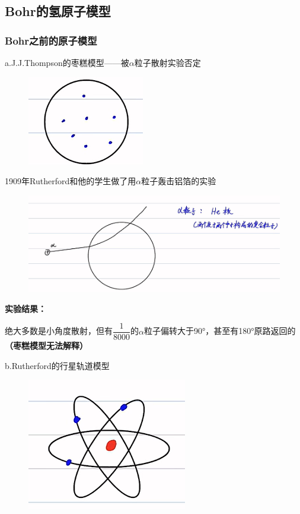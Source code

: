 \documentclass[lang=cn,10pt]{elegantbook}
\begin{document}
\subsection{Bohr的氢原子模型}
\subsubsection{Bohr之前的原子模型}
a.J.J.Thompson的枣糕模型——被$\alpha$粒子散射实验否定
\begin{figure}[H]
	\centering
	\includegraphics[width=0.7\linewidth]{figure/screenshot0010}
\end{figure}
1909年Rutherford和他的学生做了用$\alpha$粒子轰击铝箔的实验

\begin{figure}[H]
	\centering
	\includegraphics[width=0.7\linewidth]{figure/screenshot0011}
\end{figure}

\textbf{实验结果：}

绝大多数是小角度散射，但有$\dfrac{1}{8000}$的$\alpha$粒子偏转大于90°，甚至有180°原路返回的\textbf{（枣糕模型无法解释）}

b.Rutherford的行星轨道模型
\begin{figure}[H]
	\centering
	\includegraphics[width=0.7\linewidth]{figure/screenshot0012}
\end{figure}
\end{document}
